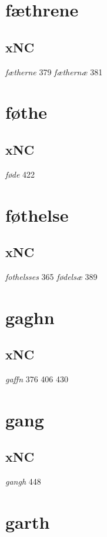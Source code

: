 \documentclass[a4paper,twocolumn]{article}
\begin{document}
\section{fæthrene}
\label{sec:orgc35d3a3}
\subsection{xNC}
\label{sec:org24755cd}
\emph{fætherne} 379 \emph{fæthernæ} 381 
\section{føthe}
\label{sec:org703b1a6}
\subsection{xNC}
\label{sec:orgaa3f2f1}
\emph{føde} 422 
\section{føthelse}
\label{sec:org3e7ff5f}
\subsection{xNC}
\label{sec:orgd916423}
\emph{fothelsses} 365 \emph{fødelsæ} 389 
\section{gaghn}
\label{sec:orgf2be2a5}
\subsection{xNC}
\label{sec:org1ec82e0}
\emph{gaffn} 376 406 430 
\section{gang}
\label{sec:orgd75ef56}
\subsection{xNC}
\label{sec:orgc1bc835}
\emph{gangh} 448 
\section{garth}
\label{sec:orgf17799c}
\end{document}
